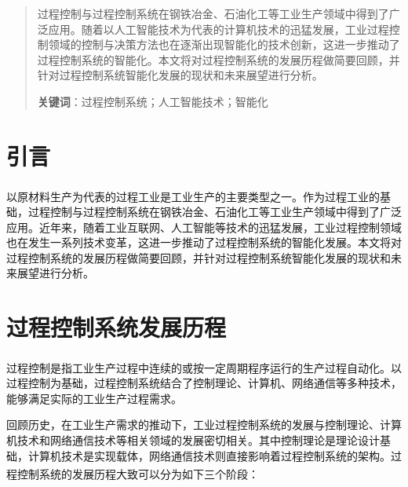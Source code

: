 \documentclass{my_class}
\begin{document}

\begin{titlepage}

\end{titlepage}

\begin{abstract}
	过程控制与过程控制系统在钢铁冶金、石油化工等工业生产领域中得到了广泛应用。随着以人工智能技术为代表的计算机技术的迅猛发展，工业过程控制领域的控制与决策方法也在逐渐出现智能化的技术创新，这进一步推动了过程控制系统的智能化。本文将对过程控制系统的发展历程做简要回顾，并针对过程控制系统智能化发展的现状和未来展望进行分析。

	\noindent \textbf{关键词}：过程控制系统；人工智能技术；智能化
\end{abstract}
\cleardoublepage

\tableofcontents
\cleardoublepage

\setcounter{section}{-1}
%
\section{引言}
以原材料生产为代表的过程工业是工业生产的主要类型之一\textsuperscript{\cite{PZKX201608005}}。作为过程工业的基础，过程控制与过程控制系统在钢铁冶金、石油化工等工业生产领域中得到了广泛应用。近年来，随着工业互联网、人工智能等技术的迅猛发展，工业过程控制领域也在发生一系列技术变革，这进一步推动了过程控制系统的智能化发展。本文将对过程控制系统的发展历程做简要回顾，并针对过程控制系统智能化发展的现状和未来展望进行分析。

%
\section{过程控制系统发展历程}

过程控制是指工业生产过程中连续的或按一定周期程序运行的生产过程自动化\textsuperscript{\cite{2021过程控制系统}}。以过程控制为基础，过程控制系统结合了控制理论、计算机、网络通信等多种技术，能够满足实际的工业生产过程需求。

回顾历史，在工业生产需求的推动下，工业过程控制系统的发展与控制理论、计算机技术和网络通信技术等相关领域的发展密切相关。其中控制理论是理论设计基础，计算机技术是实现载体，网络通信技术则直接影响着过程控制系统的架构。过程控制系统的发展历程大致可以分为如下三个阶段\textsuperscript{\cite{过程控制的发展与展望}}：
\end{document}

